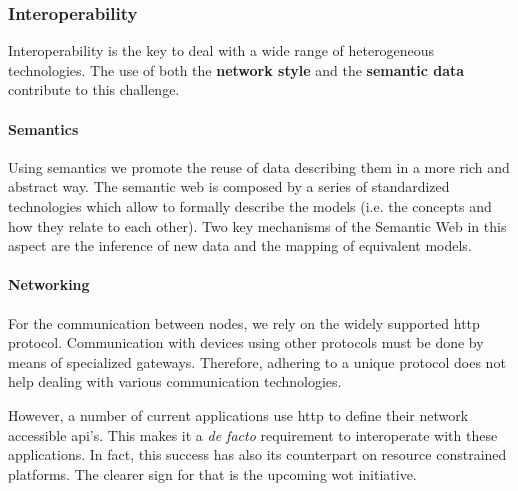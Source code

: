 \subsubsection{Interoperability}


Interoperability is the key to deal with a wide range of heterogeneous technologies.
The use of both the \textbf{network style} and the \textbf{semantic data} contribute to this challenge.


\paragraph{Semantics}

Using semantics we promote the reuse of data describing them in a more rich and abstract way.
The semantic web is composed by a series of standardized technologies which allow to formally describe the models (i.e. the concepts and how they relate to each other).
Two key mechanisms of the Semantic Web in this aspect are the inference of new data and the mapping of equivalent models.



\paragraph{Networking}

For the communication between nodes, we rely on the widely supported \ac{http} protocol. %
Communication with devices using other protocols must be done by means of specialized gateways. %
Therefore, adhering to a unique protocol does not help dealing with various communication technologies.

However, a number of current applications use \ac{http} to define their network accessible \ac{api}'s. %
This makes it a \emph{de facto} requirement to interoperate with these applications. %
In fact, this success has also its counterpart on resource constrained platforms.
The clearer sign for that is the upcoming \ac{wot} initiative.


